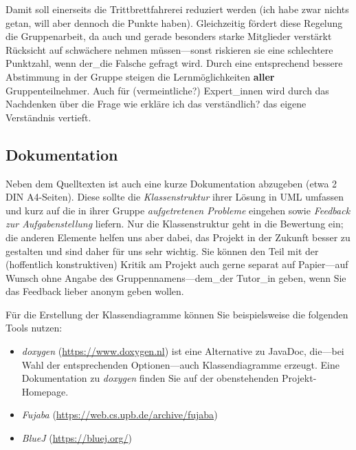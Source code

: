 Damit soll einerseits die \glqq{}Trittbrettfahrerei\grqq{} reduziert werden (\glqq{}ich habe
zwar nichts getan, will aber dennoch die Punkte haben\grqq{}). Gleichzeitig f\"ordert
diese Regelung die Gruppenarbeit, da auch und gerade besonders \glqq{}starke\grqq{}
Mitglieder verst\"arkt R\"ucksicht auf \glqq{}schw\"achere\grqq{} nehmen 
m\"ussen---sonst riskieren sie eine schlechtere Punktzahl, wenn \glqq{}der\_die Falsche\grqq{}
gefragt wird. Durch eine entsprechend bessere Abstimmung in der Gruppe steigen
die Lernm\"oglichkeiten \textbf{aller} Gruppenteilnehmer. Auch für (vermeintliche?)
\glqq{}Expert\_innen\grqq{} wird durch das Nachdenken \"uber die Frage \glqq{}wie erkläre ich das verst\"andlich?\grqq{} das eigene Verst\"andnis vertieft.

\subsection{Dokumentation}
\label{sec:docu}

Neben dem Quelltexten ist auch eine kurze Dokumentation abzugeben (etwa 2 DIN
A4-Seiten). Diese sollte die \emph{Klassenstruktur} ihrer L\"osung in UML umfassen und kurz auf die in ihrer Gruppe \emph{aufgetretenen Probleme} eingehen
sowie \emph{Feedback zur Aufgabenstellung} liefern. Nur die Klassenstruktur geht
in die Bewertung ein; die anderen Elemente helfen uns aber dabei, das Projekt
in der Zukunft besser zu gestalten und sind daher f\"ur uns sehr wichtig. Sie k\"onnen den Teil mit der (hoffentlich konstruktiven) 
Kritik am Projekt auch gerne separat auf Papier---auf Wunsch ohne Angabe des Gruppennamens---dem\_der Tutor\_in geben, wenn Sie das Feedback lieber anonym geben wollen.

Für die Erstellung der Klassendiagramme können Sie beispielsweise die folgenden Tools nutzen:

\begin{itemize}
\item \emph{doxygen} (\url{https://www.doxygen.nl}) ist eine Alternative
zu JavaDoc, die---bei Wahl der entsprechenden Optionen---auch Klassendiagramme
erzeugt. Eine Dokumentation zu \emph{doxygen} finden Sie auf der
obenstehenden Projekt-Homepage.

\item \emph{Fujaba} (\url{https://web.cs.upb.de/archive/fujaba})

\item \emph{BlueJ} (\url{https://bluej.org/})
\end{itemize}

